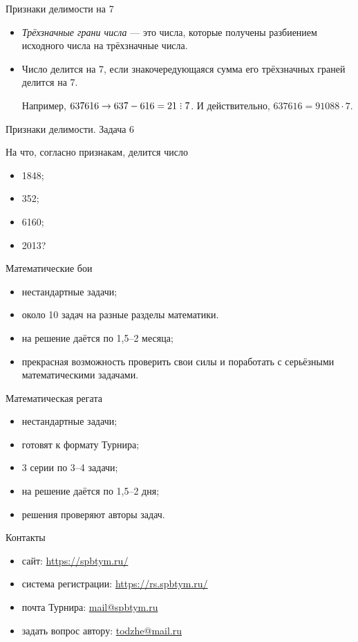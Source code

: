 \documentclass[17pt]{extarticle}
\newcommand{\divsby}{\mathrel{\rlap{.}\rlap{\raisebox{0.55ex}{.}}\raisebox{1.1ex}{.}}}
\newcommand{\newslide}[1]{\newpage \begin{center} \large #1 \end{center}}
\begin{document}
\newslide{Признаки делимости на 7}

\begin{itemize}
\item \textit{Трёхзначные грани числа} --- это числа, которые получены разбиением исходного числа на трёхзначные числа.
\item Число делится на 7, если знакочередующаяся сумма его трёхзначных граней делится на 7.

Например, $637616 \to 637-616=21 \divsby 7$. И действительно, $637616 = 91088\cdot7$.
\end{itemize}

\newslide{Признаки делимости. Задача 6}

На что, согласно признакам, делится число 
\begin{itemize}
\item 1848;
\item 352;
\item 6160;
\item 2013?
\end{itemize}

\newslide{Математические бои}

\begin{itemize}
	\item нестандартные задачи;
	\item около 10 задач на разные разделы математики.
	\item на решение даётся по 1,5--2 месяца;
	\item прекрасная возможность проверить свои силы и поработать с серьёзными математическими задачами.
\end{itemize}

\newslide{Математическая регата}

\begin{itemize}
	\item нестандартные задачи;
	\item готовят к формату Турнира;
	\item 3 серии по 3--4 задачи;
	\item на решение даётся по 1,5--2 дня;
	\item решения проверяют авторы задач.
\end{itemize}

\newslide{Контакты}

\begin{itemize}
	\item сайт: \url{https://spbtym.ru/}
	\item система регистрации: \url{https://rs.spbtym.ru/} 
	\item почта Турнира: \href{mailto: mail@spbtym.ru}{mail@spbtym.ru}
	\item задать вопрос автору: \href{mailto: todzhe@mail.ru}{todzhe@mail.ru}
\end{itemize}
\end{document}
